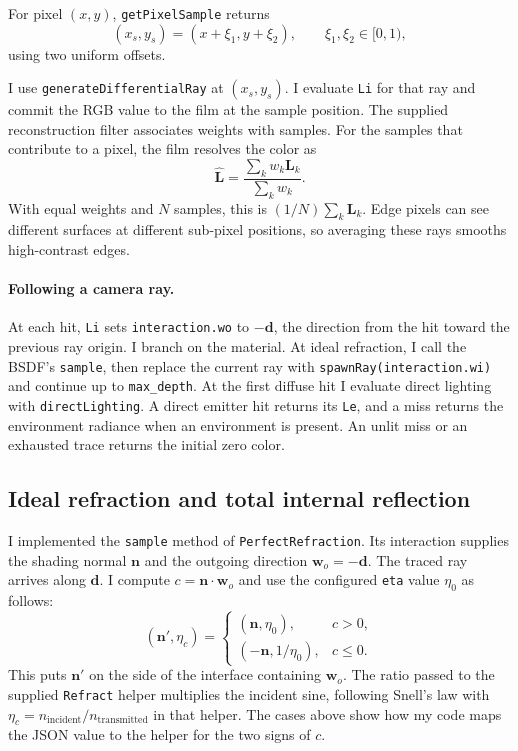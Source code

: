 \documentclass[acmtog]{acmart}
\begin{document}
For pixel $(x,y)$, \texttt{getPixelSample} returns
\begin{equation}
(x_s,y_s)=(x+\xi_1,y+\xi_2),\qquad \xi_1,\xi_2\in[0,1),
\end{equation}
using two uniform offsets.

I use \texttt{generateDifferentialRay} at $(x_s,y_s)$. I evaluate \texttt{Li} for that ray and commit the RGB value to the film at the sample position. The supplied reconstruction filter associates weights with samples. For the samples that contribute to a pixel, the film resolves the color as
\begin{equation}
\widehat{\mathbf L}
  =\frac{\sum_k w_k\mathbf L_k}{\sum_k w_k}.
\end{equation}
With equal weights and $N$ samples, this is $(1/N)\sum_k\mathbf L_k$. Edge pixels can see different surfaces at different sub-pixel positions, so averaging these rays smooths high-contrast edges.

\paragraph{Following a camera ray.}
At each hit, \texttt{Li} sets \texttt{interaction.wo} to $-\mathbf d$, the direction from the hit toward the previous ray origin. I branch on the material. At ideal refraction, I call the BSDF's \texttt{sample}, then replace the current ray with \texttt{spawnRay(interaction.wi)} and continue up to \texttt{max\_depth}. At the first diffuse hit I evaluate direct lighting with \texttt{directLighting}. A direct emitter hit returns its \texttt{Le}, and a miss returns the environment radiance when an environment is present. An unlit miss or an exhausted trace returns the initial zero color.

\subsection{Ideal refraction and total internal reflection}
I implemented the \texttt{sample} method of \texttt{PerfectRefraction}. Its interaction supplies the shading normal $\mathbf n$ and the outgoing direction $\mathbf w_o=-\mathbf d$. The traced ray arrives along $\mathbf d$. I compute $c=\mathbf n\cdot\mathbf w_o$ and use the configured \texttt{eta} value $\eta_0$ as follows:
\begin{equation}
(\mathbf n',\eta_c)=
\begin{cases}
(\mathbf n,\eta_0),&c>0,\\
(-\mathbf n,1/\eta_0),&c\leq0.
\end{cases}
\end{equation}
This puts $\mathbf n'$ on the side of the interface containing $\mathbf w_o$. The ratio passed to the supplied \texttt{Refract} helper multiplies the incident sine, following Snell's law with $\eta_c=n_{\mathrm{incident}}/n_{\mathrm{transmitted}}$ in that helper. The cases above show how my code maps the JSON value to the helper for the two signs of $c$.
\end{document}
